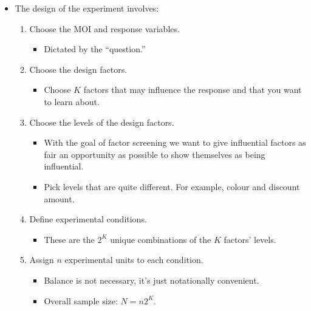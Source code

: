 \begin{itemize}[$\rightarrow$]
    \item The design of the experiment involves:
          \begin{enumerate}[1.]
              \item Choose the MOI and response variables.
                    \begin{itemize}[$\hookrightarrow$]
                        \item Dictated by the ``question.''
                    \end{itemize}
              \item Choose the design factors.
                    \begin{itemize}[$\hookrightarrow$]
                        \item Choose $ K $ factors that may influence the response and that you want to learn about.
                    \end{itemize}
              \item Choose the levels of the design factors.
                    \begin{itemize}[$\hookrightarrow$]
                        \item With the goal of factor screening we want to give influential factors as fair
                              an opportunity as possible to show themselves as being influential.
                        \item Pick levels that are quite different. For example, colour and discount amount.
                    \end{itemize}
              \item Define experimental conditions.
                    \begin{itemize}[$\hookrightarrow$]
                        \item These are the $ 2^K $ unique combinations of the $ K $ factors' levels.
                    \end{itemize}
              \item Assign $ n $ experimental units to each condition.
                    \begin{itemize}[$\hookrightarrow$]
                        \item Balance is not necessary, it's just notationally convenient.
                        \item Overall sample size: $ N=n2^K $.
                    \end{itemize}
          \end{enumerate}
\end{itemize}
